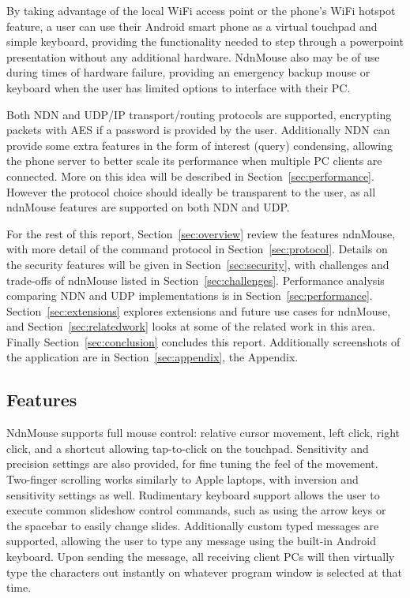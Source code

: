 \documentclass{sig-alternate}
\renewcommand\_{\textunderscore\allowbreak}  %
\begin{document}
By taking advantage of the local WiFi access point or the phone's WiFi hotspot feature, a user can use their Android smart phone as a virtual touchpad and simple keyboard, providing the functionality needed to step through a powerpoint presentation without any additional hardware. NdnMouse also may be of use during times of hardware failure, providing an emergency backup mouse or keyboard when the user has limited options to interface with their PC.

Both NDN and UDP/IP transport/routing protocols are supported, encrypting packets with AES if a password is provided by the user. Additionally NDN can provide some extra features in the form of interest (query) condensing, allowing the phone server to better scale its performance when multiple PC clients are connected. More on this idea will be described in Section~\ref{sec:performance}. However the protocol choice should ideally be transparent to the user, as all ndnMouse features are supported on both NDN and UDP.

For the rest of this report, Section~\ref{sec:overview} review the features ndnMouse, with more detail of the command protocol in Section~\ref{sec:protocol}. Details on the security features will be given in Section~\ref{sec:security}, with challenges and trade-offs of ndnMouse listed in Section~\ref{sec:challenges}. Performance analysis comparing NDN and UDP implementations is in Section~\ref{sec:performance}. Section~\ref{sec:extensions} explores extensions and future use cases for ndnMouse, and Section~\ref{sec:relatedwork} looks at some of the related work in this area. Finally Section~\ref{sec:conclusion} concludes this report. Additionally screenshots of the application are in Section~\ref{sec:appendix}, the Appendix.

\subsection{Features}
NdnMouse supports full mouse control: relative cursor movement, left click, right click, and a shortcut allowing tap-to-click on the touchpad. Sensitivity and precision settings are also provided, for fine tuning the feel of the movement. Two-finger scrolling works similarly to Apple laptops, with inversion and sensitivity settings as well. Rudimentary keyboard support allows the user to execute common slideshow control commands, such as using the arrow keys or the spacebar to easily change slides. Additionally custom typed messages are supported, allowing the user to type any message using the built-in Android keyboard. Upon sending the message, all receiving client PCs will then virtually type the characters out instantly on whatever program window is selected at that time.
\end{document}
